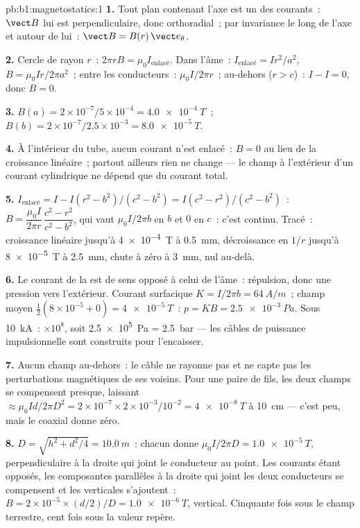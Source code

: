 \begin{solution}{pb:b1:magnetostatics:1}
\textbf{1.} Tout plan contenant l'axe est un  des courants~:
$\vect B$ lui est perpendiculaire, donc orthoradial~; par invariance le long
de l'axe et autour de lui~: $\vect B = B(r)\,\vect e_\theta$.

\textbf{2.} Cercle de rayon $r$~: $2\pi rB = \mu_0I_{\text{enlacé}}$. Dans l'âme~:
$I_{\text{enlacé}} = Ir^2/a^2$, $B = \mu_0Ir/2\pi a^2$~; entre les conducteurs~: $\mu_0I/2\pi r$~;
au-dehors ($r > c$)~: $I - I = 0$, donc $B = 0$.

\textbf{3.} $B(a) = 2 \times 10^{-7}/5 \times 10^{-4} = \qty{4.0e-4}{T}$~; $B(b) = 2 \times
10^{-7}/2.5 \times 10^{-3} = \qty{8.0e-5}{T}$.

\textbf{4.} À l'intérieur du tube, aucun courant n'est enlacé~: $B = 0$ au lieu
de la croissance linéaire~; partout ailleurs rien ne change --- le champ à
l'extérieur d'un courant cylindrique ne dépend que du courant total.

\textbf{5.} $I_{\text{enlacé}} = I - I(r^2 - b^2)/(c^2 - b^2) = I(c^2 - r^2)/(c^2 -
b^2)$~: $B = \dfrac{\mu_0I}{2\pi r}\,\dfrac{c^2 - r^2}{c^2 - b^2}$, qui vaut $\mu_0I/2\pi b$ en
$b$ et $0$ en $c$~: c'est continu. Tracé~: croissance linéaire jusqu'à \qty{4e-4}{T} à
\qty{0.5}{mm}, décroissance en $1/r$ jusqu'à \qty{8e-5}{T} à \qty{2.5}{mm}, chute à zéro à
\qty{3}{mm}, nul au-delà.

\textbf{6.} Le courant de la  est de sens opposé à celui de l'âme~: répulsion,
donc une pression vers l'extérieur. Courant surfacique $K = I/2\pi b = \qty{64}{A/m}$~; champ moyen
$\tfrac12(8 \times 10^{-5} + 0) = \qty{4e-5}{T}$~: $p = KB = \qty{2.5e-3}{Pa}$. Sous
\qty{10}{kA}~: $\times10^8$, soit \qty{2.5e5}{Pa} = \qty{2.5}{bar} --- les câbles de
puissance impulsionnelle sont construits pour l'encaisser.

\textbf{7.} Aucun champ au-dehors~: le câble ne rayonne pas et ne capte pas les
perturbations magnétiques de ses voisins. Pour une paire de fils, les deux
champs se compensent presque, laissant $\approx \mu_0Id/2\pi D^2 = 2 \times 10^{-7} \times 2 \times
10^{-3}/10^{-2} = \qty{4e-8}{T}$ à \qty{10}{cm} --- c'est peu, mais le coaxial
donne zéro.

\textbf{8.} $D = \sqrt{h^2 + d^2/4} = \qty{10.0}{m}$~: chacun donne $\mu_0I/2\pi D =
\qty{1.0e-5}{T}$, perpendiculaire à la droite qui joint le conducteur au point.
Les courants étant opposés, les composantes parallèles à la droite qui joint
les deux conducteurs se compensent et les verticales s'ajoutent~: $B = 2 \times 10^{-5} \times
(d/2)/D = \qty{1.0e-6}{T}$, vertical. Cinquante fois sous le champ terrestre,
cent fois sous la valeur repère.


\end{solution}
